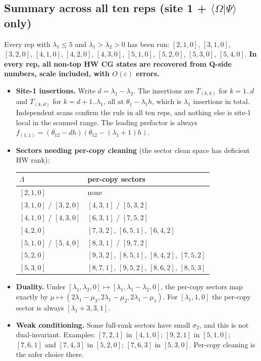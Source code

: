 \documentclass[11pt]{article}
\newcommand{\Om}{\Omega}
\newcommand{\eps}{\varepsilon}
\newcommand{\tw}{\theta_{12}}
\begin{document}
\subsection{Summary across all ten reps (site 1 + $\langle\Om|\Psi\rangle$ only)}
Every rep with $\lambda_1\le5$ and $\lambda_1>\lambda_2>0$ has been run: $[2,1,0]$, $[3,1,0]$, $[3,2,0]$, $[4,1,0]$, $[4,2,0]$, $[4,3,0]$, $[5,1,0]$, $[5,2,0]$, $[5,3,0]$, $[5,4,0]$. \textbf{In every rep, all non-top HW CG states are recovered from Q-side numbers, scale included, with $O(\eps)$ errors.}
\begin{itemize}
\item \textbf{Site-1 insertions.} Write $d=\lambda_1-\lambda_2$. The insertions are $T_{(k,k)}$ for $k=1..d$ and $T_{(k,d)}$ for $k=d+1..\lambda_1$, all at $\theta_1-\lambda_1h$, which is $\lambda_1$ insertions in total. Independent scans confirm the rule in all ten reps, and nothing else is site-1 local in the scanned range. The leading prefactor is always $f_{(1,1)}=(\tw-dh)(\tw-(\lambda_1+1)h)$.
\item \textbf{Sectors needing per-copy cleaning} (the sector clean space has deficient HW rank):
\begin{center}
\begin{tabular}{ll}
\toprule
$\Lambda$ & per-copy sectors\\
\midrule
$[2,1,0]$ & none\\
$[3,1,0]$ / $[3,2,0]$ & $[4,3,1]$ / $[5,3,2]$\\
$[4,1,0]$ / $[4,3,0]$ & $[6,3,1]$ / $[7,5,2]$\\
$[4,2,0]$ & $[7,3,2]$, $[6,5,1]$, $[6,4,2]$\\
$[5,1,0]$ / $[5,4,0]$ & $[8,3,1]$ / $[9,7,2]$\\
$[5,2,0]$ & $[9,3,2]$, $[8,5,1]$, $[8,4,2]$, $[7,5,2]$\\
$[5,3,0]$ & $[8,7,1]$, $[9,5,2]$, $[8,6,2]$, $[8,5,3]$\\
\bottomrule
\end{tabular}
\end{center}
\item \textbf{Duality.} Under $[\lambda_1,\lambda_2,0]\mapsto[\lambda_1,\lambda_1-\lambda_2,0]$, the per-copy sectors map exactly by $\mu\mapsto(2\lambda_1-\mu_3,2\lambda_1-\mu_2,2\lambda_1-\mu_1)$. For $[\lambda_1,1,0]$ the per-copy sector is always $[\lambda_1+3,3,1]$.
\item \textbf{Weak conditioning.} Some full-rank sectors have small $\sigma_2$, and this is not dual-invariant. Examples: $[7,2,1]$ in $[4,1,0]$; $[9,2,1]$ in $[5,1,0]$; $[7,6,1]$ and $[7,4,3]$ in $[5,2,0]$; $[7,6,3]$ in $[5,3,0]$. Per-copy cleaning is the safer choice there.
\end{itemize}
\end{document}
